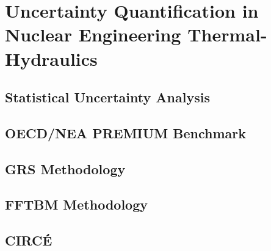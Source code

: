 \section{Uncertainty Quantification in Nuclear Engineering Thermal-Hydraulics}\label{sec:intro_uncertainty_quantification}


\subsection{Statistical Uncertainty Analysis}\label{sub:intro_statistical_uncertainty_analysis}

\subsection{OECD/NEA PREMIUM Benchmark}\label{sub:intro_premium}

\subsection{GRS Methodology}\label{sub:intro_grs_method}

\subsection{FFTBM Methodology}\label{sub:intro_fftbm_method}

\subsection{CIRC\'E}\label{sub:intro_circe_method}
